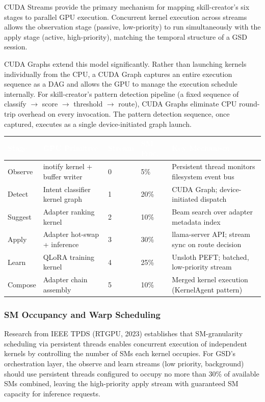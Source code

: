 \documentclass[11pt,letterpaper]{article}
\newcommand{\tableheader}[1]{\textbf{\sffamily\textcolor{white}{#1}}}
\begin{document}
CUDA Streams provide the primary mechanism for mapping skill-creator's six stages to parallel GPU execution. Concurrent kernel execution across streams allows the observation stage (passive, low-priority) to run simultaneously with the apply stage (active, high-priority), matching the temporal structure of a GSD session.

CUDA Graphs extend this model significantly. Rather than launching kernels individually from the CPU, a CUDA Graph captures an entire execution sequence as a DAG and allows the GPU to manage the execution schedule internally. For skill-creator's pattern detection pipeline (a fixed sequence of classify $\rightarrow$ score $\rightarrow$ threshold $\rightarrow$ route), CUDA Graphs eliminate CPU round-trip overhead on every invocation. The pattern detection sequence, once captured, executes as a single device-initiated graph launch.

\begin{center}
\begin{tabularx}{\textwidth}{L{2.2cm}L{2.8cm}L{1.5cm}L{1.5cm}X}
\toprule
{}
\tableheader{Stage} & \tableheader{GPU Primitive} & \tableheader{Stream} & \tableheader{SM Frac.} & \tableheader{Key Mechanism} \\
\midrule
Observe & inotify kernel + buffer writer & 0 & 5\% & Persistent thread monitors filesystem event bus \\
Detect & Intent classifier kernel graph & 1 & 20\% & CUDA Graph; device-initiated dispatch \\
Suggest & Adapter ranking kernel & 2 & 10\% & Beam search over adapter metadata index \\
Apply & Adapter hot-swap + inference & 3 & 30\% & llama-server API; stream sync on route decision \\
Learn & QLoRA training kernel & 4 & 25\% & Unsloth PEFT; batched, low-priority stream \\
Compose & Adapter chain assembly & 5 & 10\% & Merged kernel execution (KernelAgent pattern) \\
\bottomrule
\end{tabularx}
\end{center}

\subsubsection{SM Occupancy and Warp Scheduling}

Research from IEEE TPDS (RTGPU, 2023) establishes that SM-granularity scheduling via persistent threads enables concurrent execution of independent kernels by controlling the number of SMs each kernel occupies. For GSD's orchestration layer, the observe and learn streams (low priority, background) should use persistent threads configured to occupy no more than 30\% of available SMs combined, leaving the high-priority apply stream with guaranteed SM capacity for inference requests.
\end{document}
